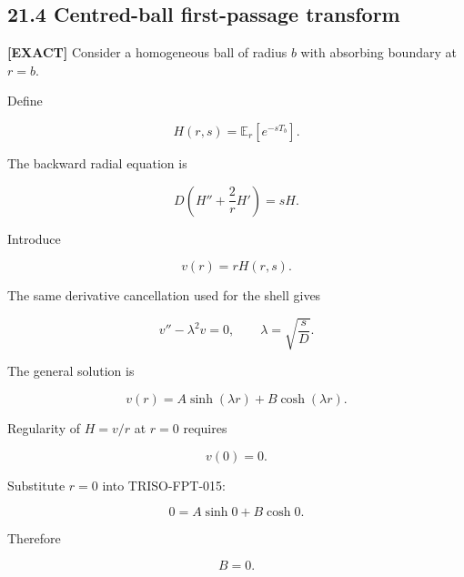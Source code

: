 \documentclass[11pt,a4paper]{article}
\begin{document}
\subsection*{21.4 Centred-ball first-passage transform}

\textbf{[EXACT]} Consider a homogeneous ball of radius $b$ with absorbing boundary at $r=b$.

Define

\begin{equation}
H(r,s)=\mathbb E_r[e^{-sT_b}].
\tag{TRISO-FPT-011}
\label{eq:triso-fpt-011}
\end{equation}

The backward radial equation is

\begin{equation}
D\left(H''+\frac{2}{r}H'\right)=sH.
\tag{TRISO-FPT-012}
\label{eq:triso-fpt-012}
\end{equation}

Introduce

\begin{equation}
v(r)=rH(r,s).
\tag{TRISO-FPT-013}
\label{eq:triso-fpt-013}
\end{equation}

The same derivative cancellation used for the shell gives

\begin{equation}
v''-\lambda^2v=0,
\qquad
\lambda=\sqrt{\frac{s}{D}}.
\tag{TRISO-FPT-014}
\label{eq:triso-fpt-014}
\end{equation}

The general solution is

\begin{equation}
v(r)=A\sinh(\lambda r)+B\cosh(\lambda r).
\tag{TRISO-FPT-015}
\label{eq:triso-fpt-015}
\end{equation}

Regularity of $H=v/r$ at $r=0$ requires

\begin{equation}
v(0)=0.
\tag{TRISO-FPT-016}
\label{eq:triso-fpt-016}
\end{equation}

Substitute $r=0$ into TRISO-FPT-015:

\begin{equation}
0=A\sinh0+B\cosh0.
\tag{TRISO-FPT-017}
\label{eq:triso-fpt-017}
\end{equation}

Therefore

\begin{equation}
B=0.
\tag{TRISO-FPT-018}
\label{eq:triso-fpt-018}
\end{equation}
\end{document}
